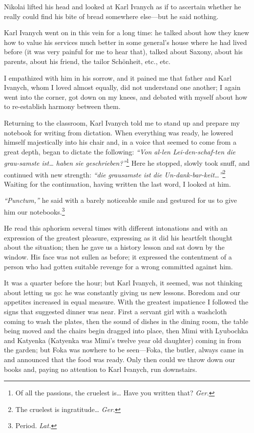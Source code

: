 Nikolai lifted his head and looked at Karl Ivanych as if to ascertain whether he really could find his bite of bread somewhere else---but he said nothing.

Karl Ivanych went on in this vein for a long time: he talked about how they knew how to value his services much better in some general's house where he had lived before (it was very painful for me to hear that), talked about Saxony, about his parents, about his friend, the tailor Sch\"onheit, etc., etc.

I empathized with him in his sorrow, and it pained me that father and Karl Ivanych, whom I loved almost equally, did not understand one another; I again went into the corner, got down on my knees, and debated with myself about how to re-establish harmony between them.

Returning to the classroom, Karl Ivanych told me to stand up and prepare my notebook for writing from dictation. When everything was ready, he lowered himself majestically into his chair and, in a voice that seemed to come from a great depth, began to dictate the following: \textit{``Von al-len Lei-den-schaf-ten die grau-samste ist\ldots{} haben sie geschrieben?''}\footnote{Of all the passions, the cruelest is\ldots{} Have you written that? \textit{Ger.}} Here he stopped, slowly took snuff, and continued with new strength: \textit{``die grausamste ist die Un-dank-bar-keit\ldots{}''}\footnote{The cruelest is ingratitude\ldots{} \textit{Ger.}} Waiting for the continuation, having written the last word, I looked at him. %

\textit{``Punctum,''} he said with a barely noticeable smile and gestured for us to give him our notebooks.\footnote{Period. \textit{Lat.}} %

He read this aphorism several times with different intonations and with an expression of the greatest pleasure, expressing as it did his heartfelt thought about the situation; then he gave us a history lesson and sat down by the window. His face was not sullen as before; it expressed the contentment of a person who had gotten suitable revenge for a wrong committed against him.

It was a quarter before the hour; but Karl Ivanych, it seemed, was not thinking about letting us go: he was constantly giving us new lessons. Boredom and our appetites increased in equal measure. With the greatest impatience I followed the signs that suggested dinner was near. First a servant girl with a washcloth coming to wash the plates, then the sound of dishes in the dining room, the table being moved and the chairs begin dragged into place, then Mimi with Lyubochka and Katyenka (Katyenka was Mimi's twelve year old daughter) coming in from the garden; but Foka was nowhere to be seen---Foka, the butler, always came in and announced that the food was ready. Only then could we throw down our books and, paying no attention to Karl Ivanych, run downstairs.

